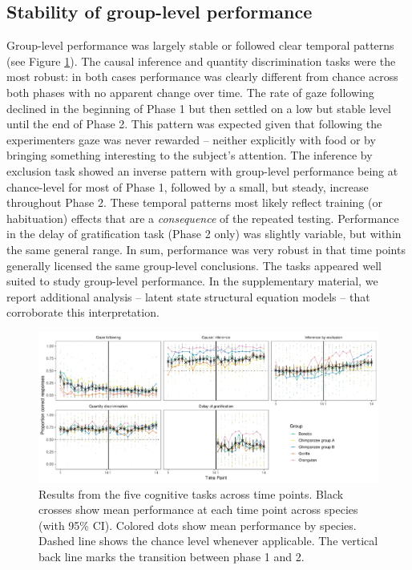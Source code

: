 \documentclass[
  man,floatsintext]{apa6}
\begin{document}
\hypertarget{stability-of-group-level-performance}{%
\subsection{Stability of group-level performance}\label{stability-of-group-level-performance}}

Group-level performance was largely stable or followed clear temporal patterns (see Figure \ref{fig:perfplot}). The causal inference and quantity discrimination tasks were the most robust: in both cases performance was clearly different from chance across both phases with no apparent change over time. The rate of gaze following declined in the beginning of Phase 1 but then settled on a low but stable level until the end of Phase 2. This pattern was expected given that following the experimenters gaze was never rewarded -- neither explicitly with food or by bringing something interesting to the subject's attention. The inference by exclusion task showed an inverse pattern with group-level performance being at chance-level for most of Phase 1, followed by a small, but steady, increase throughout Phase 2. These temporal patterns most likely reflect training (or habituation) effects that are a \emph{consequence} of the repeated testing. Performance in the delay of gratification task (Phase 2 only) was slightly variable, but within the same general range. In sum, performance was very robust in that time points generally licensed the same group-level conclusions. The tasks appeared well suited to study group-level performance. In the supplementary material, we report additional analysis -- latent state structural equation models -- that corroborate this interpretation.

\begin{figure}
\includegraphics[width=1\linewidth]{./figures/performance} \caption{Results from the five cognitive tasks across time points. Black crosses show mean performance at each time point across species (with 95\% CI). Colored dots show mean performance by species. Dashed line shows the chance level whenever applicable. The vertical back line marks the transition between phase 1 and 2.}\label{fig:perfplot}
\end{figure}
\end{document}
